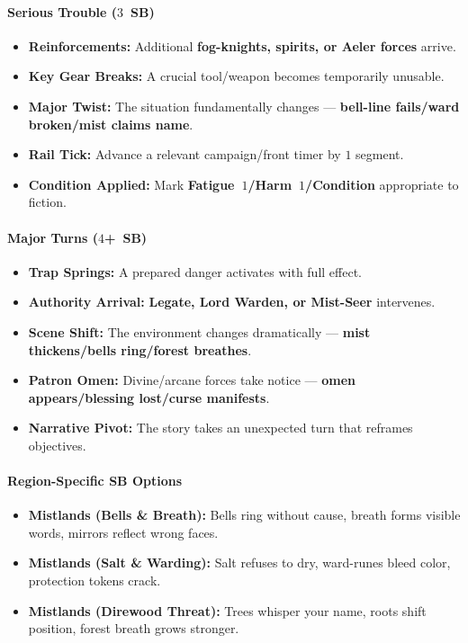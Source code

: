 \paragraph{Serious Trouble ($3$~SB)}
\begin{itemize}
\item \textbf{Reinforcements:} Additional \textbf{fog-knights, spirits, or Aeler forces} arrive.
\item \textbf{Key Gear Breaks:} A crucial tool/weapon becomes temporarily unusable.
\item \textbf{Major Twist:} The situation fundamentally changes --- \textbf{bell-line fails/ward broken/mist claims name}.
\item \textbf{Rail Tick:} Advance a relevant campaign/front timer by $1$ segment.
\item \textbf{Condition Applied:} Mark \textbf{Fatigue~$1$/Harm~$1$/Condition} appropriate to fiction.
\end{itemize}

\paragraph{Major Turns ($4$+~SB)}
\begin{itemize}
\item \textbf{Trap Springs:} A prepared danger activates with full effect.
\item \textbf{Authority Arrival:} \textbf{Legate, Lord Warden, or Mist-Seer} intervenes.
\item \textbf{Scene Shift:} The environment changes dramatically --- \textbf{mist thickens/bells ring/forest breathes}.
\item \textbf{Patron Omen:} Divine/arcane forces take notice --- \textbf{omen appears/blessing lost/curse manifests}.
\item \textbf{Narrative Pivot:} The story takes an unexpected turn that reframes objectives.
\end{itemize}

\paragraph{Region-Specific SB Options}
\begin{itemize}
\item \textbf{Mistlands (Bells \& Breath):} Bells ring without cause, breath forms visible words, mirrors reflect wrong faces.
\item \textbf{Mistlands (Salt \& Warding):} Salt refuses to dry, ward-runes bleed color, protection tokens crack.
\item \textbf{Mistlands (Direwood Threat):} Trees whisper your name, roots shift position, forest breath grows stronger.
\end{itemize}

